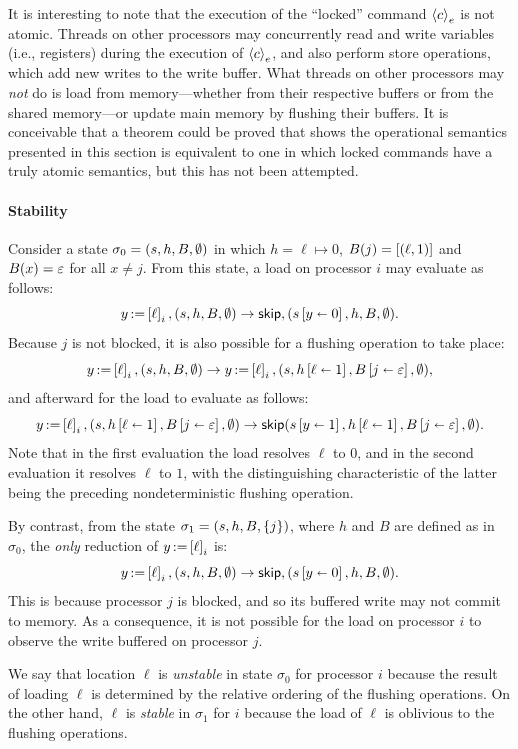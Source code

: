\documentclass[11pt]{report}         %
\begin{document}
It is interesting to note that the execution of the ``locked'' command $\cwith{e}{c}$ is not atomic. Threads on other processors may concurrently read and write variables (i.e., registers) during the execution of $\cwith{e}{c}$, and also perform store operations, which add new writes to the write buffer. What threads on other processors may \emph{not} do is load from memory---whether from their respective buffers or from the shared memory---or update main memory by flushing their buffers. It is conceivable that a theorem could be proved that shows the operational semantics presented in this section is equivalent to one in which locked commands have a truly atomic semantics, but this has not been attempted. 

\paragraph{Stability} Consider a state $\sigma_0 = (s,h,B,\nil)$ in which $h = \ell \mapsto 0$, $B(j) = \llit{(\ell,1)}$ and $B(x) = \lnil$ for all $x \neq j$. From this state, a load on processor $i$ may evaluate as follows: \[ \cload{y}{\ell}_i,(s,h,B,\nil) \step \cskip,(\funup{s}{\ptup{y}{0}},h,B,\nil).\] Because $j$ is not blocked, it is also possible for a flushing operation to take place: \[ \cload{y}{\ell}_i,(s,h,B,\nil) \step \cload{y}{\ell}_i,(s,\funup{h}{\ptup{\ell}{1}},\funup{B}{\ptup{j}{\lnil}},\nil),\] and afterward for the load to evaluate as follows: \[ \cload{y}{\ell}_i,(s,\funup{h}{\ptup{\ell}{1}},\funup{B}{\ptup{j}{\lnil}},\nil) \step \cskip(\funup{s}{\ptup{y}{1}},\funup{h}{\ptup{\ell}{1}},\funup{B}{\ptup{j}{\lnil}},\nil).\] Note that in the first evaluation the load resolves $\ell$ to $0$, and in the second evaluation it resolves $\ell$ to $1$, with the distinguishing characteristic of the latter being the preceding nondeterministic flushing operation. 

By contrast, from the state $\sigma_1 = (s,h,B,\set{j})$, where $h$ and $B$ are defined as in $\sigma_0$, the \emph{only} reduction of $\cload{y}{\ell}_i$ is: \[ \cload{y}{\ell}_i,(s,h,B,\nil) \step \cskip,(\funup{s}{\ptup{y}{0}},h,B,\nil).\] This is because processor $j$ is blocked, and so its buffered write may not commit to memory. As a consequence, it is not possible for the load on processor $i$ to observe the write buffered on processor $j$. 

We say that location $\ell$ is \emph{unstable} in state $\sigma_0$ for processor $i$ because the result of loading $\ell$ is determined by the relative ordering of the flushing operations. On the other hand, $\ell$ is \emph{stable} in $\sigma_1$ for $i$ because the load of $\ell$ is oblivious to the flushing operations. 
\end{document}
